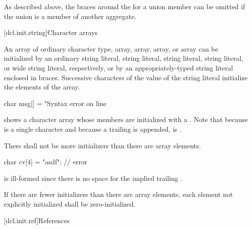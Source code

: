 \pnum
\begin{note}
As described above,
the braces around the
for a union member can be omitted if the
union is a member of another aggregate.
\end{note}

[dcl.init.string]{Character arrays}%

\pnum
An array of ordinary character type,
 array,
 array,
 array,
or  array
can be initialized by
an ordinary string literal,
 string literal,
 string literal,
 string literal, or
wide string literal,
respectively, or by an appropriately-typed string literal enclosed in
braces.
%
Successive
characters of the
value of the string literal
initialize the elements of the array.
\begin{example}

\begin{codeblock}
char msg[] = "Syntax error on line %
\end{codeblock}

shows a character array whose members are initialized
with a
.
Note that because
is a single character and
because a trailing
is appended,
is
.
\end{example}

\pnum
There shall not be more initializers than there are array elements.
\begin{example}

\begin{codeblock}
char cv[4] = "asdf";            // error
\end{codeblock}

is ill-formed since there is no space for the implied trailing
.
\end{example}

\pnum
If there are fewer initializers than there are array elements, each element not
explicitly initialized shall be zero-initialized.

[dcl.init.ref]{References}%

